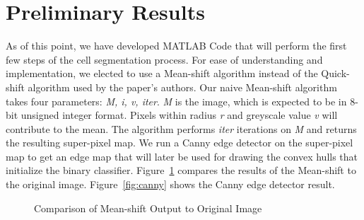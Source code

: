\documentclass[12pt, letter]{article}
\begin{document}
\section{Preliminary Results}

As of this point, we have developed MATLAB Code that will perform the first few steps of the cell segmentation process. For ease of understanding and implementation, we elected to use a Mean-shift algorithm instead of the Quick-shift algorithm used by the paper's authors. Our naive Mean-shift algorithm takes four parameters: \textit{M, i, v, iter}. \textit{M} is the image, which is expected to be in 8-bit unsigned integer format. Pixels within radius \textit{r} and greyscale value \textit{v} will contribute to the mean. The algorithm performs \textit{iter} iterations on \textit{M} and returns the resulting super-pixel map. We run a Canny edge detector on the super-pixel map to get an edge map that will later be used for drawing the convex hulls that initialize the binary classifier. Figure~\ref{fig:mean_shift} compares the results of the Mean-shift to the original image. Figure~\ref{fig:canny} shows the Canny edge detector result. 

\begin{figure}%
    \centering
    \qquad
    \caption{Comparison of Mean-shift Output to Original Image}%
    \label{fig:mean_shift}%
\end{figure}
\end{document}
